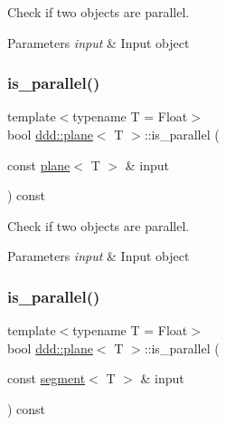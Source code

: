 Check if two objects are parallel. 


\begin{DoxyParams}{Parameters}
{\em input} & Input object \\
\hline
\end{DoxyParams}
\mbox{\label{classddd_1_1plane_af94adfd507e373307fea80b6c4061d80}} 
\subsubsection{\texorpdfstring{is\+\_\+parallel()}{is\_parallel()}\hspace{0.1cm}{\footnotesize\ttfamily [4/5]}}
{\footnotesize\ttfamily template$<$typename T = Float$>$ \\
bool \hyperlink{classddd_1_1plane}{ddd\+::plane}$<$ T $>$\+::is\+\_\+parallel (\begin{DoxyParamCaption}\item[{const \hyperlink{classddd_1_1plane}{plane}$<$ T $>$ \&}]{input }\end{DoxyParamCaption}) const\hspace{0.3cm}{\ttfamily [inline]}}



Check if two objects are parallel. 


\begin{DoxyParams}{Parameters}
{\em input} & Input object \\
\hline
\end{DoxyParams}
\mbox{\label{classddd_1_1plane_a4118eb93ecb24fcb6b76bfb22c10b451}} 
\subsubsection{\texorpdfstring{is\+\_\+parallel()}{is\_parallel()}\hspace{0.1cm}{\footnotesize\ttfamily [5/5]}}
{\footnotesize\ttfamily template$<$typename T = Float$>$ \\
bool \hyperlink{classddd_1_1plane}{ddd\+::plane}$<$ T $>$\+::is\+\_\+parallel (\begin{DoxyParamCaption}\item[{const \hyperlink{classddd_1_1segment}{segment}$<$ T $>$ \&}]{input }\end{DoxyParamCaption}) const\hspace{0.3cm}{\ttfamily [inline]}}



